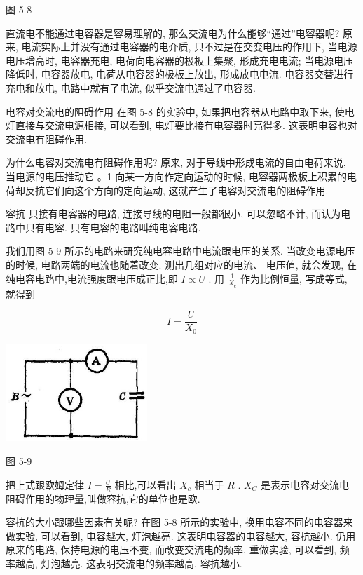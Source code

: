 \documentclass[10pt]{article}
\begin{document}
图 5-8

直流电不能通过电容器是容易理解的, 那么交流电为什么能够“通过”电容器呢? 原来, 电流实际上并没有通过电容器的电介质, 只不过是在交变电压的作用下, 当电源电压增高时, 电容器充电, 电荷向电容器的极板上集聚, 形成充电电流; 当电源电压降低时, 电容器放电, 电荷从电容器的极板上放出, 形成放电电流. 电容器交替进行充电和放电, 电路中就有了电流, 似乎交流电通过了电容器.

电容对交流电的阻碍作用 在图 5-8 的实验中, 如果把电容器从电路中取下来, 使电灯直接与交流电源相接, 可以看到, 电灯要比接有电容器时亮得多. 这表明电容也对交流电有阻碍作用.

为什么电容对交流电有阻碍作用呢? 原来, 对于导线中形成电流的自由电荷来说, 当电源的电压推动它 。1 向某一方向作定向运动的时候, 电容器两极板上积累的电荷却反抗它们向这个方向的定向运动, 这就产生了电容对交流电的阻碍作用.

容抗 只接有电容器的电路, 连接导线的电阻一般都很小, 可以忽略不计, 而认为电路中只有电容. 只有电容的电路叫纯电容电路.

我们用图 5-9 所示的电路来研究纯电容电路中电流跟电压的关系. 当改变电源电压的时候, 电路两端的电流也随着改变. 测出几组对应的电流、 电压值, 就会发现, 在纯电容电路中,电流强度跟电压成正比,即 \(I \propto U\) . 用 \(\frac{1}{{X}_{c}}\) 作为比例恒量, 写成等式, 就得到

\[
I = \frac{U}{{X}_{0}}
\]

\begin{center}
\includegraphics[max width=0.4\textwidth]{images/01913056-1f15-74d8-9184-9aab52c9d66b_171_223086.jpg}
\end{center}

图 5-9

把上式跟欧姆定律 \(I = \frac{U}{R}\) 相比,可以看出 \({X}_{c}\) 相当于 \(R\) . \({X}_{C}\) 是表示电容对交流电阻碍作用的物理量,叫做容抗,它的单位也是欧.

容抗的大小跟哪些因素有关呢? 在图 5-8 所示的实验中, 换用电容不同的电容器来做实验, 可以看到, 电容越大, 灯泡越亮. 这表明电容器的电容越大, 容抗越小. 仍用原来的电路, 保持电源的电压不变, 而改变交流电的频率, 重做实验, 可以看到, 频率越高, 灯泡越亮. 这表明交流电的频率越高, 容抗越小.
\end{document}
